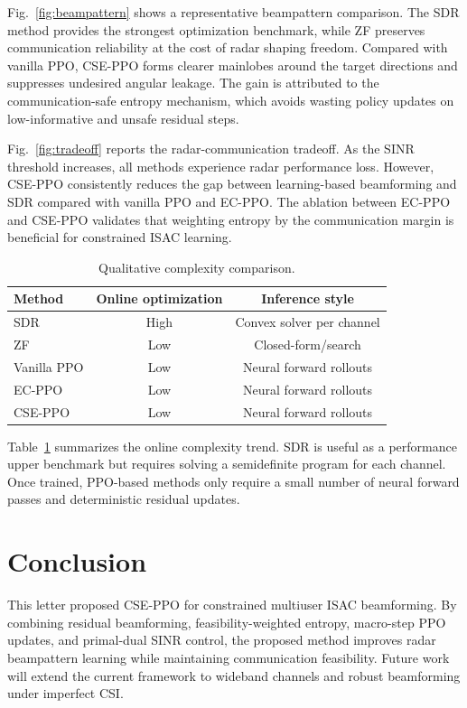 \documentclass[10pt,journal]{IEEEtran}
\begin{document}
Fig.~\ref{fig:beampattern} shows a representative beampattern comparison.
The SDR method provides the strongest optimization benchmark, while ZF
preserves communication reliability at the cost of radar shaping freedom.
Compared with vanilla PPO, CSE-PPO forms clearer mainlobes around the
target directions and suppresses undesired angular leakage. The gain is
attributed to the communication-safe entropy mechanism, which avoids
wasting policy updates on low-informative and unsafe residual steps.

Fig.~\ref{fig:tradeoff} reports the radar-communication tradeoff. As the
SINR threshold increases, all methods experience radar performance loss.
However, CSE-PPO consistently reduces the gap between learning-based
beamforming and SDR compared with vanilla PPO and EC-PPO. The ablation
between EC-PPO and CSE-PPO validates that weighting entropy by the
communication margin is beneficial for constrained ISAC learning.

\begin{table}[t]
\centering
\caption{Qualitative complexity comparison.}
\label{tab:complexity}
\begin{tabular}{lcc}
\toprule
Method & Online optimization & Inference style\\
\midrule
SDR & High & Convex solver per channel\\
ZF & Low & Closed-form/search\\
Vanilla PPO & Low & Neural forward rollouts\\
EC-PPO & Low & Neural forward rollouts\\
CSE-PPO & Low & Neural forward rollouts\\
\bottomrule
\end{tabular}
\end{table}

Table~\ref{tab:complexity} summarizes the online complexity trend. SDR is
useful as a performance upper benchmark but requires solving a semidefinite
program for each channel. Once trained, PPO-based methods only require a
small number of neural forward passes and deterministic residual updates.

\section{Conclusion}
This letter proposed CSE-PPO for constrained multiuser ISAC beamforming.
By combining residual beamforming, feasibility-weighted entropy,
macro-step PPO updates, and primal-dual SINR control, the proposed method
improves radar beampattern learning while maintaining communication
feasibility. Future work will extend the current framework to wideband
channels and robust beamforming under imperfect CSI.



\end{document}
